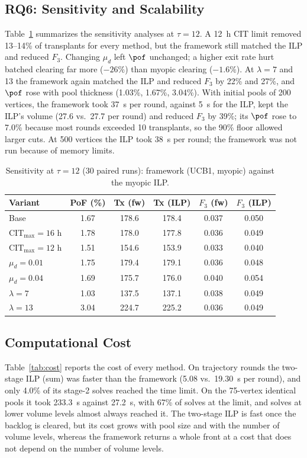 \documentclass[journal]{IEEEtran}
\begin{document}
\subsection{RQ6: Sensitivity and Scalability}
\label{sec:results:rq6}
Table~\ref{tab:sens} summarizes the sensitivity analyses at
$\tau = 12$. A 12~h CIT limit removed 13--14\% of transplants for every
method, but the framework still matched the ILP and reduced $F_3$.
Changing $\mu_d$ left $\pof$ unchanged; a higher exit rate hurt batched
clearing far more ($-26\%$) than myopic clearing ($-1.6\%$). At
$\lambda = 7$ and 13 the framework again matched the ILP and reduced
$F_3$ by 22\% and 27\%, and $\pof$ rose with pool thickness (1.03\%,
1.67\%, 3.04\%). With initial pools of 200 vertices, the framework took
37~s per round, against 5~s for the ILP, kept the ILP's volume (27.6
vs.\ 27.7 per round) and reduced $F_3$ by 39\%; its $\pof$ rose to 7.0\%
because most rounds exceeded 10 transplants, so the 90\% floor allowed
larger cuts. At 500 vertices the ILP took 38~s per round; the framework
was not run because of memory limits.

\begin{table}[!htbp]
\caption{Sensitivity at $\tau = 12$ (30 paired runs): framework (UCB1,
myopic) against the myopic ILP.}
\label{tab:sens}
\begin{tabular}{lccccc}
\toprule
Variant & PoF (\%) & Tx (fw) & Tx (ILP) & $F_3$ (fw) & $F_3$ (ILP) \\
\midrule
Base                          & 1.67 & 178.6 & 178.4 & 0.037 & 0.050 \\
$\mathrm{CIT}_{\max} = 16$ h  & 1.78 & 178.0 & 177.8 & 0.036 & 0.049 \\
$\mathrm{CIT}_{\max} = 12$ h  & 1.51 & 154.6 & 153.9 & 0.033 & 0.040 \\
$\mu_d = 0.01$                & 1.75 & 179.4 & 179.1 & 0.036 & 0.048 \\
$\mu_d = 0.04$                & 1.69 & 175.7 & 176.0 & 0.040 & 0.054 \\
$\lambda = 7$                 & 1.03 & 137.5 & 137.1 & 0.038 & 0.049 \\
$\lambda = 13$                & 3.04 & 224.7 & 225.2 & 0.036 & 0.049 \\
\bottomrule
\end{tabular}
\end{table}

\subsection{Computational Cost}
\label{sec:results:cost}
Table~\ref{tab:cost} reports the cost of every method. On trajectory
rounds the two-stage ILP (sum) was faster than the framework (5.08 vs.\
19.30~s per round), and only 4.0\% of its stage-2 solves reached the time
limit. On the 75-vertex identical pools it took 233.3~s against 27.2~s,
with 67\% of solves at the limit, and solves at lower volume levels almost
always reached it. The two-stage ILP is fast once the backlog is cleared,
but its cost grows with pool size and with the number of volume levels,
whereas the framework returns a whole front at a cost that does not depend on the number of volume levels.
\end{document}
